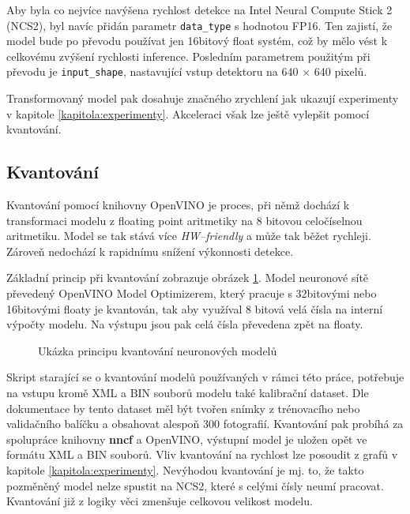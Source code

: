 Aby byla co nejvíce navýšena rychlost detekce na Intel Neural Compute Stick 2 (NCS2), byl navíc přidán parametr \texttt{data\_type} s hodnotou FP16. Ten zajistí, že model bude po převodu používat jen 16bitový float systém, což by mělo vést k celkovému zvýšení rychlosti inference. Posledním parametrem použitým při převodu je \texttt{input\_shape}, nastavující vstup detektoru na 640 $\times$ 640 pixelů.

Transformovaný model pak dosahuje značného zrychlení jak ukazují experimenty v kapitole \ref{kapitola:experimenty}. Akceleraci však lze ještě vylepšit pomocí kvantování.

\subsection*{Kvantování}
Kvantování \cite{quantization} pomocí knihovny OpenVINO je proces, při němž dochází k transformaci modelu z floating point aritmetiky na 8 bitovou celočíselnou aritmetiku. Model se tak stává více \emph{HW--friendly} a může tak běžet rychleji. Zároveň nedochází k rapidnímu snížení výkonnosti detekce.

Základní princip při kvantování zobrazuje obrázek \ref{obrazek:kvantovani}. Model neuronové sítě převedený OpenVINO Model Optimizerem, který pracuje s 32bitovými nebo 16bitovými floaty je kvantován, tak aby využíval 8 bitová velá čísla na interní výpočty modelu. Na výstupu jsou pak celá čísla převedena zpět na floaty. 

\begin{figure}[H]
  \begin{center}
  \label{obrazek:kvantovani}
  \caption{Ukázka principu kvantování neuronových modelů \cite{quantization}}
  \end{center}
\end{figure}

Skript starající se o kvantování modelů používaných v rámci této práce, potřebuje na vstupu kromě XML a BIN souborů modelu také kalibrační dataset. Dle dokumentace by tento dataset měl být tvořen snímky z trénovacího nebo validačního balíčku a obsahovat alespoň 300 fotografií. Kvantování pak probíhá za spolupráce knihovny \textbf{nncf} a OpenVINO, výstupní model je uložen opět ve formátu XML a BIN souborů. Vliv kvantování na rychlost lze posoudit z grafů v kapitole \ref{kapitola:experimenty}. Nevýhodou kvantování je mj. to, že takto pozměněný model nelze spustit na NCS2, které s celými čísly neumí pracovat. Kvantování již z logiky věci zmenšuje celkovou velikost modelu.

